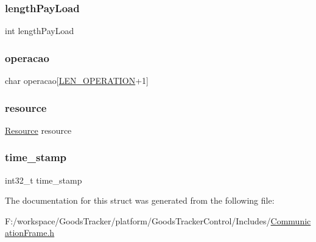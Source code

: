 \mbox{\label{struct_header_af60ad441a9839ec90aace2e6c5d4e1cd}} 
\subsubsection{\texorpdfstring{length\+Pay\+Load}{lengthPayLoad}}
{\footnotesize\ttfamily int length\+Pay\+Load}

\mbox{\label{struct_header_ac8bc9851d68fde59ab31b3bc66fe4967}} 
\subsubsection{\texorpdfstring{operacao}{operacao}}
{\footnotesize\ttfamily char operacao\mbox{[}\hyperlink{_communication_frame_8h_a11b05d589133eb96b765d67e85cebb39}{L\+E\+N\+\_\+\+O\+P\+E\+R\+A\+T\+I\+ON}+1\mbox{]}}

\mbox{\label{struct_header_a3b11dfb162ae3f6ff66be0063d97a50c}} 
\subsubsection{\texorpdfstring{resource}{resource}}
{\footnotesize\ttfamily \hyperlink{_cmd_8h_acf246a87e41f47012fc7628989d3fe95}{Resource} resource}

\mbox{\label{struct_header_a5cb2d854f1ecd743685db7d52e8806e1}} 
\subsubsection{\texorpdfstring{time\+\_\+stamp}{time\_stamp}}
{\footnotesize\ttfamily int32\+\_\+t time\+\_\+stamp}



The documentation for this struct was generated from the following file\+:\begin{DoxyCompactItemize}
\item 
F\+:/workspace/\+Goods\+Tracker/platform/\+Goods\+Tracker\+Control/\+Includes/\hyperlink{_communication_frame_8h}{Communication\+Frame.\+h}\end{DoxyCompactItemize}
